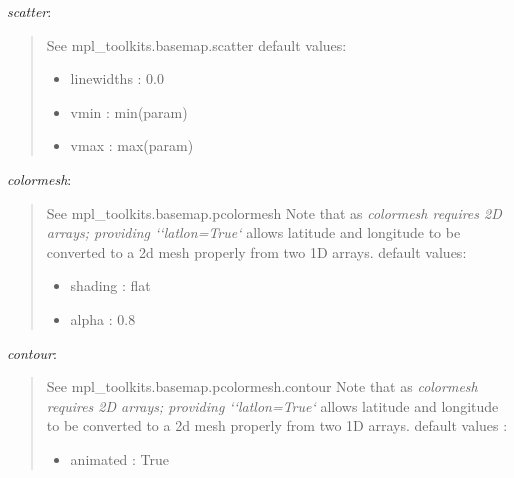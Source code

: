 \documentclass[letterpaper,10pt,english]{sphinxhowto}
\begin{document}
\begin{fulllineitems}
\emph{scatter}:
\begin{quote}

See mpl\_toolkits.basemap.scatter
default values:
\begin{itemize}
\item {} 
linewidths : 0.0

\item {} 
vmin : min(param)

\item {} 
vmax : max(param)

\end{itemize}
\end{quote}

\emph{colormesh}:
\begin{quote}

See mpl\_toolkits.basemap.pcolormesh
Note that as \emph{colormesh requires 2D arrays; providing
{}`{}`latlon=True{}`} allows latitude and longitude to be converted to a
2d mesh properly from two 1D arrays.
default values:
\begin{itemize}
\item {} 
shading : flat

\item {} 
alpha : 0.8

\end{itemize}
\end{quote}

\emph{contour}:
\begin{quote}

See mpl\_toolkits.basemap.pcolormesh.contour
Note that as \emph{colormesh requires 2D arrays; providing
{}`{}`latlon=True{}`} allows latitude and longitude to be converted to a
2d mesh properly from two 1D arrays.
default values :
\begin{itemize}
\item {} 
animated : True

\end{itemize}
\end{quote}

\end{fulllineitems}

\end{document}

